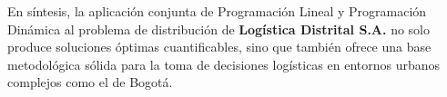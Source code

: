 \documentclass[12pt]{article}
\begin{document}
En síntesis, la aplicación conjunta de Programación Lineal y Programación Dinámica al problema de distribución de \textbf{Logística Distrital S.A.} no solo produce soluciones óptimas cuantificables, sino que también ofrece una base metodológica sólida para la toma de decisiones logísticas en entornos urbanos complejos como el de Bogotá.
\end{document}
